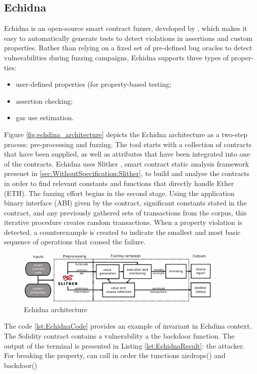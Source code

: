 \subsection{Echidna}
\label{sec:Specification:Echidna}
Echidna is an open-source smart contract fuzzer, developed by \citet{Echidna}, which makes it easy to automatically generate tests to detect violations in
assertions and custom properties.
Rather than relying on a fixed set of pre-defined bug oracles to detect vulnerabilities
during fuzzing campaigns, Echidna supports three types of proper-
ties: 
\begin{itemize}
    \item user-defined properties (for property-based testing;
    \item assertion checking;
    \item gas use estimation.
\end{itemize}

Figure \autoref{fig:echdina_architecture} depicts the Echidna architecture as a two-step process: pre-processing and fuzzing.
The tool starts with a collection of contracts that have been supplied, as well as attributes that have been integrated into one of the contracts.
Echidna uses Slither , smart contract static analysis framework presenet in \autoref{sec:WithoutSpecification:Slither}, to build and analyse the contracts in order to find relevant constants and functions that directly handle Ether (ETH).
The fuzzing effort begins in the second stage. 
Using the application binary interface (ABI) given by the contract, significant constants stated in the contract, 
and any previously gathered sets of transactions from the corpus, this iterative procedure creates random transactions. 
When a property violation is detected, a counterexample is created to indicate the smallest and most basic sequence of operations that caused the failure. 

\begin{figure}
    \centering
    \includegraphics[width=10cm]{logos/echidna.png}
    \caption{Echidna architecture}
    \label{fig:echdina_architecture}
\end{figure}

The code \autoref{lst:EchidnaCode} provides an example of invariant in Echdina context. The Solidity contract contains a vulnerability a the backdoor function. The output of the terminal is presented in Listing \autoref{lst:EchidnaResult}: the attacker. For breaking the property, can call in order the tunctions airdrops() and backdoor()

